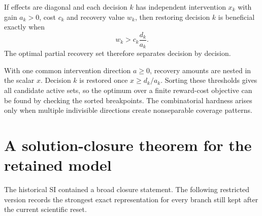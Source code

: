 \documentclass[11pt,letterpaper]{article}
\theoremstyle{plain}
\newcommand{\1}{\mathbf 1}
\begin{document}
If effects are diagonal and each decision $k$ has independent intervention $x_k$ with gain $a_k>0$, cost $c_k$ and recovery value $w_k$, then restoring decision $k$ is beneficial exactly when
\begin{equation}
 w_k>c_k\frac{d_k}{a_k}.
\label{eq:s_diagonal_partial}
\end{equation}
The optimal partial recovery set therefore separates decision by decision.

With one common intervention direction $a\ge0$, recovery amounts are nested in the scalar $x$. Decision $k$ is restored once $x\ge d_k/a_k$. Sorting these thresholds gives all candidate active sets, so the optimum over a finite reward-cost objective can be found by checking the sorted breakpoints. The combinatorial hardness arises only when multiple indivisible directions create nonseparable coverage patterns.

\section{A solution-closure theorem for the retained model}
The historical SI contained a broad closure statement. The following restricted version records the strongest exact representation for every branch still kept after the current scientific reset.
\end{document}
